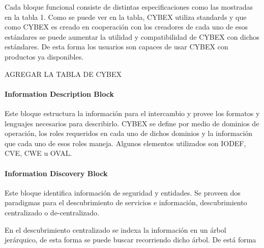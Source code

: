 Cada bloque funcional consiste de distintas especificaciones como las mostradas 
en la tabla 1. Como se puede ver en la tabla, CYBEX utiliza standards y que como 
CYBEX es creado en cooperación con los creadores de cada uno de esos estándares 
se puede aumentar la utilidad y compatibilidad de CYBEX con dichos estándares. 
De esta forma los usuarios son capaces de usar CYBEX con productos ya 
disponibles.

AGREGAR LA TABLA DE CYBEX

\paragraph{Information Description Block}

Este bloque estructura la información para el intercambio y provee los formatos 
y lenguajes necesarios para describirlo. CYBEX se define por medio de dominios 
de operación, los roles requeridos en cada uno de dichos dominios y la 
información que cada uno de esos roles maneja. Algunos elementos utilizados son 
IODEF, CVE, CWE u OVAL.

\paragraph{Information Discovery Block}

Este bloque identifica información de seguridad y entidades. Se proveen dos 
paradigmas para el descubrimiento de servicios e información, descubrimiento 
centralizado o de-centralizado.

En el descubrimiento centralizado se indexa la información en un árbol 
jerárquico, de esta forma se puede buscar recorriendo dicho árbol. De está forma





